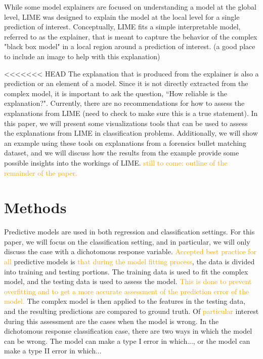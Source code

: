 \documentclass[AMS,STIX2COL]{WileyNJD-v2}\usepackage[]{graphicx}\usepackage[]{color}
\newcommand{\hh}[1]{\textcolor{orange}{#1}}
\begin{document}
While some model explainers are focused on understanding a model at the global level, LIME was designed to explain the model at the local level for a single prediction of interest. Conceptually, LIME fits a simple interpretable model, referred to as the explainer, that is meant to capture the behavior of the complex "black box model" in a local region around a prediction of interest. (a good place to include an image to help with this explanation)

<<<<<<< HEAD
The explanation that is produced from the explainer is also a prediction or an element of a model. Since it is not directly extracted from the complex model, it is important to ask the question, ``How reliable is the explanation?". Currently, there are no recommendations for how to assess the explanations from LIME (need to check to make sure this is a true statement). In this paper, we will present some visualizations tools that can be used to assess the explanations from LIME in classification problems. Additionally, we will show an example using these tools on explanations from a forensics bullet matching dataset, and we will discuss how the results from the example provide some possible insights into the workings of LIME.
\hh{still to come: outline of the remainder of the paper.}


\section{Methods}

Predictive models are used in both regression and classification settings. For this paper, we will focus on the classification setting, and in particular, we will only discuss the case with a dichotomous response variable. \hh{Accepted best practice for all}  predictive models is \hh{that during the model fitting process}, the data is divided into training and testing portions. The training data is used to fit the complex model, and the testing data is used to assess the model. \hh{This is done to prevent overfitting and to get a more accurate assessment of the prediction error of the model.} The complex model is then applied to the features in the testing data, and the resulting predictions are compared to ground truth. Of \hh{particular} interest during this assessment are the cases when the model is wrong. In the dichotomous response classification case, there are two ways in which the model can be wrong. The model can make a type I error in which..., or the model can make a type II error in which...
\end{document}
